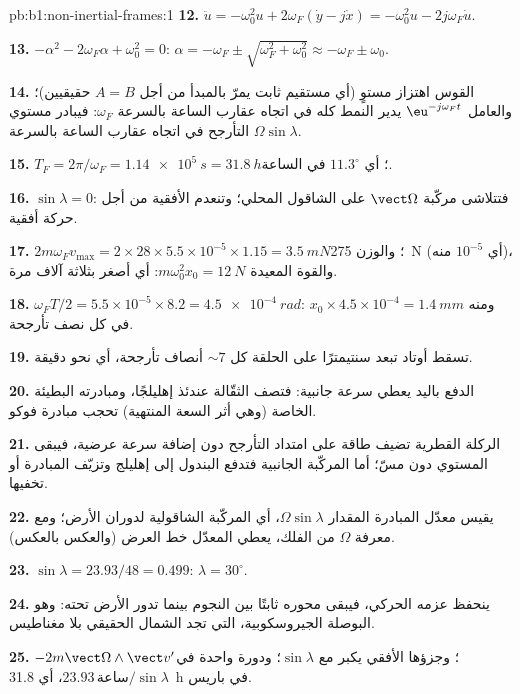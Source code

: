 \begin{solution}{pb:b1:non-inertial-frames:1}
\textbf{12.} $\ddot u = -\omega_0^2u + 2\omega_F(\dot y - j\dot x) = -\omega_0^2u -
2j\omega_F\dot u$.

\textbf{13.} $-\alpha^2 - 2\omega_F\alpha + \omega_0^2 = 0$: $\alpha = -\omega_F \pm
\sqrt{\omega_F^2 + \omega_0^2} \approx -\omega_F \pm \omega_0$.

\textbf{14.} القوس اهتزاز مستوٍ (أي مستقيم ثابت يمرّ بالمبدأ
من أجل $A = B$ حقيقيين)؛ والعامل $\eu^{-j\omega_Ft}$ يدير النمط كله
في اتجاه عقارب الساعة بالسرعة $\omega_F$: فيبادر مستوي التأرجح في اتجاه عقارب الساعة بالسرعة
$\Omega\sin\lambda$.

\textbf{15.} $T_F = 2\pi/\omega_F = \qty{1.14e5}{s} = \qty{31.8}{h}$؛ أي $11.3^\circ$
في الساعة.

\textbf{16.} $\sin\lambda = 0$: فتتلاشى مركّبة $\vect\Omega$ على الشاقول المحلي؛
وتنعدم  الأفقية من أجل حركة أفقية.

\textbf{17.} $2m\omega_Fv_{\max} = 2 \times 28 \times 5.5\times10^{-5} \times 1.15 =
\qty{3.5}{mN}$؛ والوزن \qty{275}{N} (أي $10^{-5}$ منه)، والقوة المعيدة
$m\omega_0^2x_0 = \qty{12}{N}$: أي أصغر بثلاثة آلاف مرة.

\textbf{18.} $\omega_FT/2 = 5.5\times10^{-5} \times 8.2 = \qty{4.5e-4}{rad}$: ومنه
$x_0 \times 4.5\times10^{-4} = \qty{1.4}{mm}$ في كل نصف تأرجحة.

\textbf{19.} تسقط أوتاد تبعد سنتيمترًا على الحلقة كل $\sim 7$
أنصاف تأرجحة، أي نحو دقيقة.

\textbf{20.} الدفع باليد يعطي سرعة جانبية: فتصف الثقّالة عندئذ
إهليلجًا، ومبادرته البطيئة الخاصة (وهي أثر السعة
المنتهية) تحجب مبادرة فوكو.

\textbf{21.} الركلة القطرية تضيف طاقة على امتداد التأرجح دون إضافة
سرعة عرضية، فيبقى المستوي دون مسّ؛ أما المركّبة
الجانبية فتدفع البندول إلى إهليلج وتزيّف المبادرة أو تخفيها.

\textbf{22.} يقيس معدّل المبادرة المقدار $\Omega\sin\lambda$، أي المركّبة
الشاقولية لدوران الأرض؛ ومع معرفة $\Omega$ من الفلك، يعطي
المعدّل خط العرض (والعكس بالعكس).

\textbf{23.} $\sin\lambda = 23.93/48 = 0.499$: $\lambda = 30^\circ$.

\textbf{24.} ينحفظ عزمه الحركي، فيبقى محوره ثابتًا
بين النجوم بينما تدور الأرض تحته: وهو البوصلة الجيروسكوبية، التي
تجد الشمال الحقيقي بلا مغناطيس.

\textbf{25.}  $-2m\vect\Omega\wedge\vect v'$؛ وجزؤها
الأفقي يكبر مع $\sin\lambda$؛ ودورة واحدة في $23.93\,\text{ساعة}/\sin\lambda$،
أي \qty{31.8}{h} في باريس.
\end{solution}
